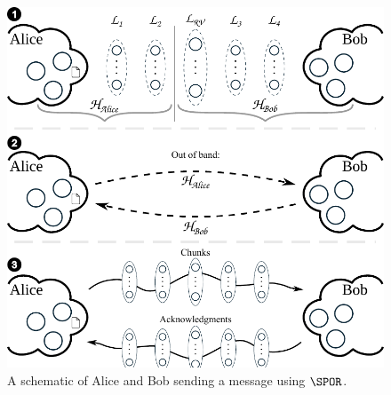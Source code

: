 




 



\begin{figure}
  \includegraphics[width=\linewidth]{figures/file_exchange_v2.pdf}
  \caption{\label{fig:file-exchange}%
    A schematic of Alice and Bob sending a message using \(\SPOR\).
  }
\end{figure}


